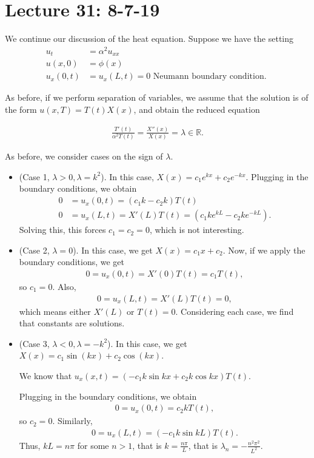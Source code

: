 \documentclass{article}
\newcommand{\RR}{\mathbb{R}}
\begin{document}
\section{Lecture 31: 8-7-19}

We continue our discussion of the heat equation.  Suppose we have the setting
\begin{align*}
  u_t &= \alpha^2 u_{xx} \\
  u(x, 0) &= \phi(x) \\
  u_x(0, t) &= u_x(L, t) = 0 \text{ Neumann boundary condition. }
\end{align*}

As before, if we perform separation of variables, we assume that the solution is of the form $u(x, T) = T(t) X(x)$, and obtain the reduced equation

\begin{align*}
  \frac{T'(t)}{\alpha^2 T(t)} = \frac{X''(x)}{X(x)} = \lambda \in \RR.
\end{align*}

As before, we consider cases on the sign of $\lambda$.

\begin{itemize}
  \item (Case 1, $\lambda > 0, \lambda = k^2$).  In this case, $X(x) = c_1 e^{kx} + c_2 e^{-kx}$.  Plugging in the boundary conditions, we obtain
    \begin{align*}
      0 &= u_x(0, t) = (c_1 k - c_2 k) T(t) \\
      0 &= u_x(L, t) = X'(L) T(t) = (c_1 k e^{kL} - c_2 k e^{-kL}).
    \end{align*}
    Solving this, this forces $c_1 = c_2 = 0$, which is not interesting.

  \item (Case 2, $\lambda = 0$).  In this case, we get $X(x) = c_1 x + c_2$.  Now, if we apply the boundary conditions, we get
    \begin{align*}
      0 = u_x(0, t) = X'(0) T(t) = c_1 T(t),
    \end{align*}
    so $c_1 = 0$.
    Also,
    \begin{align*}
      0 = u_x(L, t) = X'(L) T(t) = 0,
    \end{align*}
    which means either $X'(L)$ or $T(t) = 0$.  Considering each case, we find that constants are solutions.
  \item (Case 3, $\lambda < 0, \lambda = - k^2$).  In this case, we get $X(x) = c_1 \sin (kx) + c_2 \cos (kx)$. 

    We know that $u_x(x, t) = (-c_1 k \sin kx + c_2 k \cos kx)T(t)$.

    Plugging in the boundary conditions, we obtain
    \begin{align*}
      0 = u_x(0, t) =  c_2 k T(t),
    \end{align*}
    so $c_2 = 0$.
    Similarly,
    \begin{align*}
      0 = u_x(L, t) = (-c_1 k \sin kL) T(t).
    \end{align*}
    Thus, $kL = n \pi$ for some $n > 1$, that is $k = \frac{n \pi}{L}$, that is $\lambda_n = - \frac{n^2 \pi^2}{L^2}$.
\end{itemize}
\end{document}
